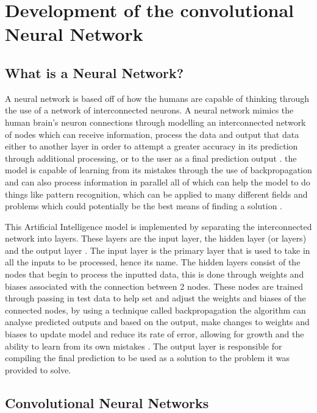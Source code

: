 \documentclass[]{final_report}
\begin{document}
\clearpage
\section{Development of the convolutional Neural Network}

\subsection{What is a Neural Network?}

A neural network is based off of how the humans are capable of thinking through the use of a network of interconnected neurons. A neural network mimics the human brain’s neuron connections through modelling an interconnected network of nodes which can receive information, process the data and output that data either to another layer in order to attempt a greater accuracy in its prediction through additional processing, or to the user as a final prediction output \cite{Dongare2012}. the model is capable of learning from its mistakes through the use of backpropagation and can also process information in parallel all of which can help the model to do things like pattern recognition, which can be applied to many different fields and problems which could potentially be the best means of finding a solution \cite{Woodford2023}. 

This Artificial Intelligence model is implemented by separating the interconnected network into layers. These layers are the input layer, the hidden layer (or layers) and the output layer \cite{IBM2024} . The input layer is the primary layer that is used to take in all the inputs to be processed, hence its name. The hidden layers consist of the nodes that begin to process the inputted data, this is done through weights and biases associated with the connection between 2 nodes. These nodes are trained through passing in test data to help set and adjust the weights and biases of the connected nodes, by using a technique called backpropagation the algorithm can analyse predicted outputs and based on the output, make changes to weights and biases to update model and reduce its rate of error, allowing for growth and the ability to learn from its own mistakes \cite{Schmidhuber2015} . The output layer is responsible for compiling the final prediction to be used as a solution to the problem it was provided to solve. 

\subsection{Convolutional Neural Networks}
\end{document}
